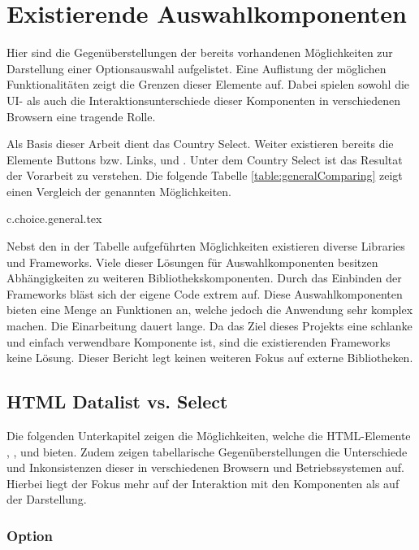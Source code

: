 \chapter{Existierende Auswahlkomponenten}
\label{chap:existingComponents}

Hier sind die Gegenüberstellungen der bereits vorhandenen Möglichkeiten zur Darstellung einer Optionsauswahl aufgelistet. 
Eine Auflistung der möglichen Funktionalitäten zeigt die Grenzen dieser Elemente auf. 
Dabei spielen sowohl die UI- als auch die Interaktionsunterschiede dieser Komponenten in verschiedenen Browsern eine tragende Rolle. 

Als Basis dieser Arbeit dient das Country Select. 
Weiter existieren bereits die Elemente Buttons bzw. Links,  und . 
Unter dem Country Select ist das Resultat der Vorarbeit zu verstehen. 
Die folgende Tabelle \ref{table:generalComparing} zeigt einen Vergleich der genannten Möglichkeiten. 

{c.choice.general.tex}

Nebst den in der Tabelle aufgeführten Möglichkeiten existieren diverse Libraries und Frameworks. 
Viele dieser Lösungen für Auswahlkomponenten besitzen Abhängigkeiten zu weiteren Bibliothekskomponenten. 
Durch das Einbinden der Frameworks bläst sich der eigene Code extrem auf. 
Diese Auswahlkomponenten bieten eine Menge an Funktionen an, welche jedoch die Anwendung sehr komplex machen. 
Die Einarbeitung dauert lange. 
Da das Ziel dieses Projekts eine schlanke und einfach verwendbare Komponente ist, sind die existierenden Frameworks keine Lösung. 
Dieser Bericht legt keinen weiteren Fokus auf externe Bibliotheken. 


\section{HTML Datalist vs. Select}
\label{sec:datalistSelect}

Die folgenden Unterkapitel zeigen die Möglichkeiten, welche die HTML-Elemente , ,  und  bieten. 
Zudem zeigen tabellarische Gegenüberstellungen die Unterschiede und Inkonsistenzen dieser in verschiedenen Browsern und Betriebssystemen auf. 
Hierbei liegt der Fokus mehr auf der Interaktion mit den Komponenten als auf der Darstellung. 


\subsection{Option}
\label{sec:option}

